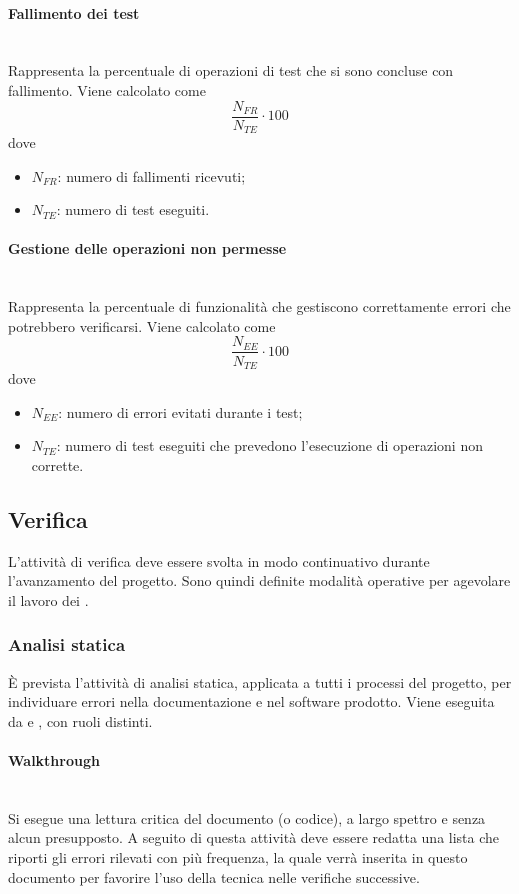 \paragraph{Fallimento dei test}\mbox{}\\
Rappresenta la percentuale di operazioni di test che si sono concluse con fallimento. Viene calcolato come
\[ \frac{N_{FR}}{N_{TE}} \cdot 100\]
dove
\begin{itemize}
	\item $N_{FR}$: numero di fallimenti ricevuti;
	\item $N_{TE}$: numero di test eseguiti.
\end{itemize}

\paragraph{Gestione delle operazioni non permesse}\mbox{}\\
Rappresenta la percentuale di funzionalità che gestiscono correttamente errori che potrebbero verificarsi. Viene calcolato come
\[ \frac{N_{EE}}{N_{TE}} \cdot 100\]
dove
\begin{itemize}
	\item $N_{EE}$: numero di errori evitati durante i test;
	\item $N_{TE}$: numero di test eseguiti che prevedono l'esecuzione di operazioni non corrette.
\end{itemize} 


\subsection{Verifica}
L’attività di verifica deve essere svolta in modo continuativo durante l'avanzamento del progetto. Sono quindi definite modalità operative per agevolare il lavoro dei \Verificatori.

\subsubsection{Analisi statica}
\`{E} prevista l'attività di analisi statica, applicata a tutti i processi del progetto, per individuare errori nella documentazione e nel software prodotto. Viene eseguita da \Verificatori{} e \Programmatori{}, con ruoli distinti.

\paragraph{Walkthrough} \mbox{}\\
Si esegue una lettura critica del documento (o codice), a largo spettro e senza alcun presupposto. A seguito di questa attività deve essere redatta una lista che riporti gli errori rilevati con più frequenza, la quale verrà inserita in questo documento per favorire l'uso della tecnica  nelle verifiche successive.

